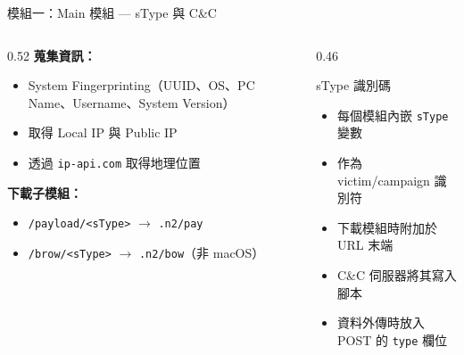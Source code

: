 \documentclass{beamer}
\begin{document}
\begin{frame}{模組一：Main 模組 — sType 與 C\&C}
  \begin{columns}[T]
    \begin{column}{0.52\textwidth}
      \textbf{蒐集資訊：}
      \begin{itemize}
        \item System Fingerprinting（UUID、OS、PC Name、Username、System Version）
        \item 取得 Local IP 與 Public IP
        \item 透過 \texttt{ip-api.com} 取得地理位置
      \end{itemize}

      \textbf{下載子模組：}
      \begin{itemize}
        \item \texttt{/payload/<sType>} $\rightarrow$ \texttt{.n2/pay}
        \item \texttt{/brow/<sType>} $\rightarrow$ \texttt{.n2/bow}（非 macOS）
      \end{itemize}

    \end{column}
    \begin{column}{0.46\textwidth}
      \begin{block}{sType 識別碼}
        \begin{itemize}
          \item 每個模組內嵌 \texttt{sType} 變數
          \item 作為 victim/campaign 識別符
          \item 下載模組時附加於 URL 末端
          \item C\&C 伺服器將其寫入腳本
          \item 資料外傳時放入 POST 的 \texttt{type} 欄位
        \end{itemize}
      \end{block}

    \end{column}
  \end{columns}
\end{frame}
\end{document}
